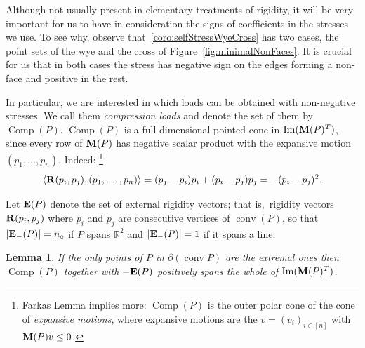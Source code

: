 \documentclass{amsart}
\newtheorem{lemma}[theorem]{Lemma}
\theoremstyle{definition}
\newcommand{\R}{\mathbb{R}} %
\renewcommand{\b}[1]{{\boldsymbol{#1}}} %
\DeclareMathOperator{\conv}{conv} %
\DeclareMathOperator{\Ima}{Im} %
\newcommand{\darkblue}{\color{darkblue}} %
\newcommand{\defn}[1]{\textsl{\darkblue #1}} %
\newcommand{\vincent}[1]{\todo[size=\scriptsize, color=blue!30]{\rm #1 \\ \hfill --- V.}}
\newcommand{\paco}[1]{\todo[size=\scriptsize, color=orange!30]{\rm #1 \\ \hfill --- P.}}
\newcommand{\Rvector}{\b{\rm R}} %
\newcommand{\Mmatrix}{\b{\rm M}} %
\newcommand{\Ematrix}{\b{\rm E}} %
\newcommand{\Comp}{\operatorname{Comp} } %
\begin{document}
Although not usually present in elementary treatments of rigidity, it will be very important for us to have in consideration the signs of coefficients in the stresses we use. 
To see why, observe that~\cref{coro:selfStressWyeCross} has two cases, the point sets of the wye and the cross of Figure~\ref{fig:minimalNonFaces}.
It is crucial for us that in both cases the stress has negative sign on the edges forming a non-face and positive in the rest.

In particular, we are interested in which loads can be obtained with non-negative stresses. We call them \defn{compression loads} and denote the set of them by $\Comp(P)$.
\vincent{I would use $\operatorname{Comp}(P)$.}\paco{Done}
$\Comp(P)$ is a full-dimensional pointed cone in $\Ima(\Mmatrix(P)^T)$, since every row of $\Mmatrix(P)$ has negative scalar product with the expansive motion $(p_1, \dots, p_n)$. Indeed:%
\footnote{Farkas Lemma implies more: $\Comp(P)$ is the outer polar cone of the cone of \defn{expansive motions}, where expansive motions are the $v=(v_i)_{i\in [n]}$ with $\Mmatrix(P) v \le 0$.}
\[
\langle \Rvector(p_i,p_j), (p_1,\dots, p_n)\rangle =
(p_j-p_i) p_i + (p_i-p_j) p_j = - (p_i-p_j)^2.
\]

Let $\Ematrix(P)$ denote the set of external rigidity vectors; that is,~rigidity vectors $\Rvector(p_i,p_j)$ where $p_i$ and $p_j$ are consecutive vertices of $\conv(P)$, so that $|\Ematrix_-(P)| = n_\circ$ if $P$ spans $\R^2$ and $|\Ematrix_-(P)| = 1$ if it spans a line.

\begin{lemma}
\label{lem:equil_cone}
If the only points of $P$ in $\partial(\conv P)$ are the extremal ones then $\Comp(P)$ together with $-\Ematrix(P)$ positively spans the whole of $\Ima(\Mmatrix(P)^T)$.
\end{lemma}
\end{document}
